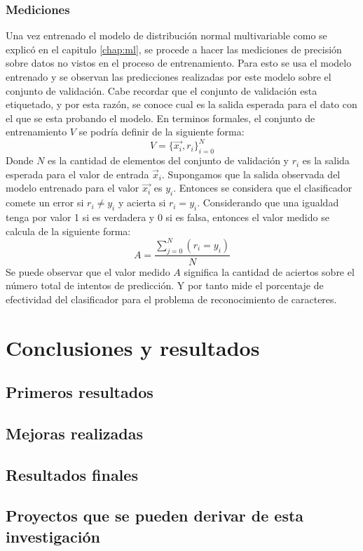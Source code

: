 \documentclass[a4paper, 11pt, oneside]{report}
\begin{document}
\subsection{Mediciones}
Una vez entrenado el modelo de distribución normal multivariable como se explicó en el capitulo \ref{chap:ml}, se procede a hacer las mediciones de precisión sobre datos no vistos en el proceso de entrenamiento. Para esto se usa el modelo entrenado y se observan las predicciones realizadas por este modelo sobre el conjunto de validación. Cabe recordar que el conjunto de validación esta etiquetado, y por esta razón, se conoce cual es la salida esperada para el dato con el que se esta probando el modelo. En terminos formales, el conjunto de entrenamiento $V$ se podría definir de la siguiente forma:
\[ V = \{\vec{x_i},r_i\}_{i=0}^N \]
Donde $N$ es la cantidad de elementos del conjunto de validación y $r_i$ es la salida esperada para el valor de entrada $\vec{x}_i$. Supongamos que la salida observada del modelo entrenado para el valor $\vec{x_i}$ es $y_i$. Entonces se considera que el clasificador comete un error si $r_i \ne y_i$ y acierta si $r_i = y_i$. Considerando que una igualdad tenga por valor 1 si es verdadera y 0 si es falsa, entonces el valor medido se calcula de la siguiente forma:
\[ A = \frac{ \sum_{j=0}^{N}(r_i=y_i) }{N} \]
Se puede observar que el valor medido $A$ significa la cantidad de aciertos sobre el número total de intentos de predicción. Y por tanto mide el porcentaje de efectividad del clasificador para el problema de reconocimiento de caracteres.

\chapter{Conclusiones y resultados}

\section{Primeros resultados}

\section{Mejoras realizadas}

\section{Resultados finales}

\section{Proyectos que se pueden derivar de esta investigación}
\end{document}
